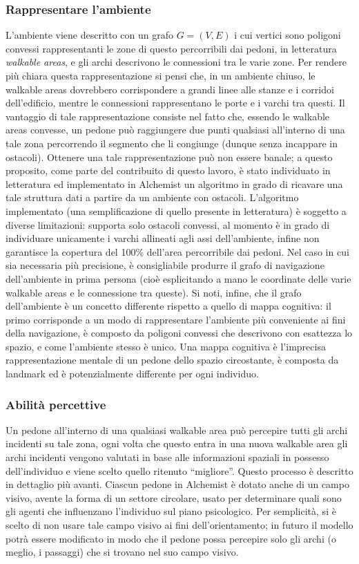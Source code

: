\documentclass[12pt,a4paper,openright,oneside]{book}
\begin{document}
\subsubsection{Rappresentare l'ambiente} 
L’ambiente viene descritto con un grafo \(G = (V, E)\) i cui vertici sono poligoni convessi rappresentanti le zone di questo percorribili dai pedoni, in letteratura \emph{walkable areas}, e gli archi descrivono le connessioni tra le varie zone. Per rendere più chiara questa rappresentazione si pensi che, in un ambiente chiuso, le walkable areas dovrebbero corrispondere a grandi linee alle stanze e i corridoi dell’edificio, mentre le connessioni rappresentano le porte e i varchi tra questi. Il vantaggio di tale rappresentazione consiste nel fatto che, essendo le walkable areas convesse, un pedone può  raggiungere due punti qualsiasi all’interno di una tale zona percorrendo il segmento che li congiunge (dunque senza incappare in ostacoli). Ottenere una tale rappresentazione può non essere banale; a questo proposito, come parte del contribuito di questo lavoro, è stato individuato in letteratura ed implementato in Alchemist un algoritmo \cite{HaleDeaccon} in grado di ricavare una tale struttura dati a partire da un ambiente con ostacoli. L’algoritmo implementato (una semplificazione di quello presente in letteratura) è soggetto a diverse limitazioni: supporta solo ostacoli convessi, al momento è in grado di individuare unicamente i varchi allineati agli assi dell'ambiente, infine non garantisce la copertura del 100\% dell’area percorribile dai pedoni. Nel caso in cui sia necessaria più precisione, è consigliabile produrre il grafo di navigazione dell'ambiente in prima persona (cioè esplicitando a mano le coordinate delle varie walkable areas e le connessione tra queste). Si noti, infine, che il grafo dell'ambiente è un concetto differente rispetto a quello di mappa cognitiva: il primo corrisponde a un modo di rappresentare l'ambiente più conveniente ai fini della navigazione, è composto da poligoni convessi che descrivono con esattezza lo spazio, e come l'ambiente stesso è unico. Una mappa cognitiva è l'imprecisa rappresentazione mentale di un pedone dello spazio circostante, è composta da landmark ed è potenzialmente differente per ogni individuo.

\subsubsection{Abilità percettive}
Un pedone all’interno di una qualsiasi walkable area può percepire tutti gli archi incidenti su tale zona, ogni volta che questo entra in una nuova walkable area gli archi incidenti vengono valutati in base alle informazioni spaziali in possesso dell’individuo e viene scelto quello ritenuto “migliore”. Questo processo è descritto in dettaglio più avanti.
Ciascun pedone in Alchemist è dotato anche di un campo visivo, avente la forma di un settore circolare, usato per determinare quali sono gli agenti che influenzano l’individuo sul piano psicologico. Per semplicità, si è scelto di non usare tale campo visivo ai fini dell’orientamento; in futuro il modello potrà essere modificato in modo che il pedone possa percepire solo gli archi (o meglio, i passaggi) che si trovano nel suo campo visivo.
\end{document}
